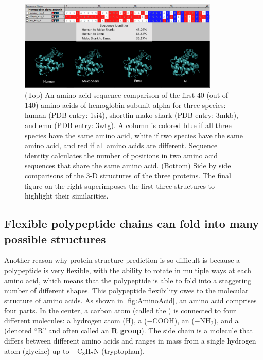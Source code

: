 \begin{figure}[h]
	\centering
	\mySfFamily
	\includegraphics[width = 0.85\textwidth]{../images/SequenceStructureExample.png}
	\caption{(Top) An amino acid sequence comparison of the first 40 (out of 140) amino acids of hemoglobin subunit alpha for three species: human (PDB entry: 1si4), shortfin mako shark (PDB entry: 3mkb), and emu (PDB entry: 3wtg). A column is colored blue if all three species have the same amino acid, white if two species have the same amino acid, and red if all amino acids are different. Sequence identity calculates the number of positions in two amino acid sequences that share the same amino acid. (Bottom) Side by side comparisons of the 3-D structures of the three proteins. The final figure on the right superimposes the first three structures to highlight their similarities.}
	\label{fig:SequenceStructureExample}
\end{figure}

\subsection{Flexible polypeptide chains can fold into many possible structures}

Another reason why protein structure prediction is so difficult is because a polypeptide is very flexible, with the ability to rotate in multiple ways at each amino acid, which means that the polypeptide is able to fold into a staggering number of different shapes. This polypeptide flexibility owes to the molecular structure of amino acids. As shown in \autoref{fig:AminoAcid}, an amino acid comprises four parts. In the center, a carbon atom (called the ) is connected to four different molecules: a hydrogen atom (H), a  ($-\text{COOH}$), an  ($-\text{NH}_2$), and a  (denoted ``R'' and often called an \textbf{R group}). The side chain is a molecule that differs between different amino acids and ranges in mass from a single hydrogen atom (glycine) up to $-\text{C}_8\text{H}_7\text{N}$ (tryptophan).\\

